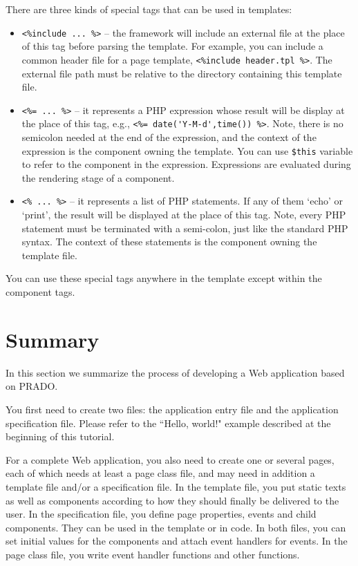\documentclass{book}
\begin{document}
There are three kinds of special tags that can be used in
templates:
\begin{itemize}

 \item \verb|<%include ... %>|  --  the framework will include an external
 file at the place of this tag before parsing the template.
 For example, you can include a common header file for a page
 template, \verb|<%include header.tpl %>|. The external file path must be
 relative to the directory containing this template file.

 \item \verb|<%= ... %>| -- it represents a PHP expression whose
 result will be display at the place of this tag, e.g.,
 \verb|<%= date('Y-M-d',time()) %>|. Note, there is no semicolon
 needed at the end of the expression, and the context of the
 expression is the component owning the template. You can use
 \verb|$this| variable to refer to the component in the
 expression. Expressions are evaluated during the rendering stage
 of a component.

 \item \verb|<% ... %>| -- it represents a list of PHP statements.
 If any of them `echo' or `print', the result will be displayed at
 the place of this tag. Note, every PHP statement must be
 terminated with a semi-colon, just like the standard PHP syntax.
 The context of these statements is the component owning the
 template file.

\end{itemize}


You can use these special tags anywhere in the template except
within the component tags.


\section{Summary}

In this section we summarize the process of developing a Web
application based on PRADO.


You first need to create two files: the application entry file and
the application specification file. Please refer to the ``Hello,
world!" example described at the beginning of this tutorial.


For a complete Web application, you also need to create one or
several pages, each of which needs at least a page class file, and
may need in addition a template file and/or a specification file.
In the template file, you put static texts as well as components
according to how they should finally be delivered to the user. In
the specification file, you define page properties, events
and child components. They can be used in the template or in code.
In both files, you can set initial values for the components and
attach event handlers for events. In the page class file, you
write event handler functions and other functions.
\end{document}
